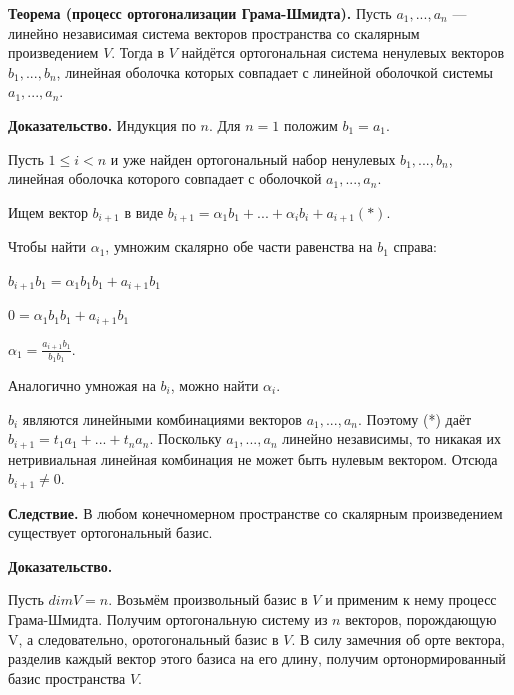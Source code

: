 \documentclass[a4paper]{article}
\begin{document}
    \begin{htheorem}
        \textbf{Теорема (процесс ортогонализации Грама-Шмидта).} Пусть $a_1, ..., a_n$ --- линейно независимая система векторов пространства со скалярным произведением $V$. Тогда в $V$ найдётся ортогональная система ненулевых векторов $b_1, ..., b_n$, линейная оболочка которых совпадает с линейной оболочкой системы $a_1, ..., a_n$.
    \end{htheorem}

    \begin{hproof}
        \textbf{Доказательство.}
        Индукция по $n$. Для $n=1$ положим $b_1=a_1$.

        Пусть $1 \leq i < n$ и уже найден ортогональный набор ненулевых $b_1, ..., b_n$, линейная оболочка которого совпадает с оболочкой $a_1, ..., a_n$.

        Ищем вектор $b_{i+1}$ в виде $b_{i+1} = \alpha_1 b_1 + ... + \alpha_i b_i + a_{i+1} (*)$.

        Чтобы найти $\alpha_1$, умножим скалярно обе части равенства на $b_1$ справа:

        $b_{i+1} b_1 = \alpha_1 b_1 b_1 + a_{i+1} b_1$

        $0 = \alpha_1 b_1 b_1 + a_{i+1} b_1$

        $\displaystyle \alpha_1 = \frac{a_{i+1}b_1}{b_1b_1}$.

        Аналогично умножая на $b_i$, можно найти $\alpha_i$.

        $b_i$ являются линейными комбинациями векторов $a_1, ..., a_n$. Поэтому (*) даёт $b_{i+1} = t_1a_1 + ... + t_na_n$. Поскольку $a_1, ..., a_n$ линейно независимы, то никакая их нетривиальная линейная комбинация не может быть нулевым вектором. Отсюда $b_{i+1} \neq 0$.
    \end{hproof}

    \begin{htheorem}
        \textbf{Следствие.} В любом конечномерном пространстве со скалярным произведением существует ортогональный базис.
    \end{htheorem}

    \begin{hproof}
        \textbf{Доказательство.}

        Пусть $dimV = n$. Возьмём произвольный базис в $V$ и применим к нему процесс Грама-Шмидта. Получим ортогональную систему из $n$ векторов, порождающую V, а следовательно, оротогональный базис в $V$. В силу замечния об орте вектора, разделив каждый вектор этого базиса на его длину, получим ортонормированный базис пространства $V$.
    \end{hproof}
\end{document}
